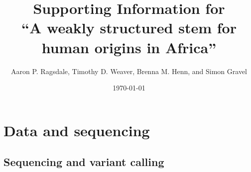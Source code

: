 \documentclass[]{article}
\begin{document}
\title{Supporting Information for\\
``A weakly structured stem for human origins in Africa''}
\author{Aaron P. Ragsdale, Timothy D. Weaver, Brenna M. Henn, and Simon Gravel}
\date{\today}
\maketitle

\renewcommand{\thefigure}{S\arabic{figure}}
\renewcommand{\thetable}{S\arabic{table}}
\renewcommand{\theequation}{S\arabic{equation}}
\setcounter{figure}{0}
\setcounter{table}{0}
\setcounter{equation}{0}

\tableofcontents
\newpage

\section{Data and sequencing}

\subsection{Sequencing and variant calling}
\end{document}
